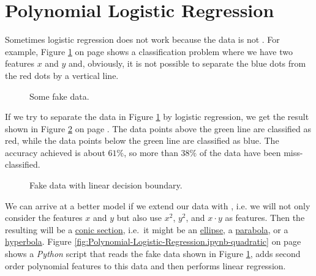 \section{Polynomial Logistic Regression}
Sometimes logistic regression does not work because the data is not .  For example,
Figure \ref{fig:fake-data.pdf} on page \pageref{fig:fake-data.pdf} shows a classification problem where we have
two features $x$ and $y$ and, obviously, it is not possible to separate the blue dots from the red dots by a
vertical line.

\begin{figure}[!th]
\caption{Some fake data.}
\label{fig:fake-data.pdf}
\end{figure}

If we try to separate the data in Figure \ref{fig:fake-data.pdf} by logistic regression, we get the result
shown in Figure \ref{fig:fake-data-line.pdf} on page \pageref{fig:fake-data-line.pdf}.  The data points above
the green line are classified as red, while the data points below the green line are classified as blue.  The
accuracy achieved is about $61\%$, so more than $38\%$ of the data have been miss-classified.

\begin{figure}[!th]
\caption{Fake data with linear decision boundary.}
\label{fig:fake-data-line.pdf}
\end{figure}

We can arrive at a better model if we extend our data with , i.e. we will not only
consider the features $x$ and $y$ but also use $x^2$, $y^2$, and $x \cdot y$ as features.  Then the resulting
 will be a \href{https://en.wikipedia.org/wiki/Conic_section}{conic section}, i.e.~it
might be an \href{https://en.wikipedia.org/wiki/Ellipse}{ellipse}, a
\href{https://en.wikipedia.org/wiki/Parabola}{parabola}, or a
\href{https://en.wikipedia.org/wiki/Hyperbola}{hyperbola}. 
Figure \ref{fig:Polynomial-Logistic-Regression.ipynb-quadratic} on page
\pageref{fig:Polynomial-Logistic-Regression.ipynb-quadratic} shows a \textsl{Python} script that reads the fake
data shown in Figure \ref{fig:fake-data.pdf}, adds second order polynomial features to this data and then
performs linear regression.


